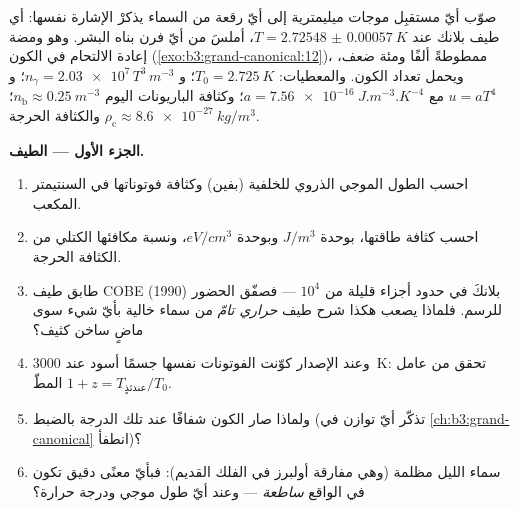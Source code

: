 \begin{problem}\label{pb:b3:photons-phonons:1}
صوّب أيّ مستقبِل موجات ميليمترية إلى أيّ رقعة من السماء يذكرْ
الإشارة نفسها: أي طيف بلانك عند $T =
\qty{2.72548(57)}{K}$، أملسَ من أيّ فرن بناه البشر.
وهو ومضة إعادة الالتحام في الكون
(\cref{exo:b3:grand-canonical:12})، ممطوطةً ألفًا ومئة ضعف،
ويحمل تعداد الكون. والمعطيات: $T_0 =
\qty{2.725}{K}$؛ و $n_\gamma = \num{2.03e7}\,T^3\,\unit{m^{-3}}$؛ و
$u = aT^4$ مع $a = \qty{7.56e-16}{J.m^{-3}.K^{-4}}$؛ وكثافة الباريونات
اليوم $n_{\text{b}} \approx \qty{0.25}{m^{-3}}$؛ والكثافة الحرجة
$\rho_{\text{c}} \approx \qty{8.6e-27}{kg/m^3}$.

\medskip\noindent\textbf{الجزء الأول --- الطيف.}
\begin{enumerate}
  \item احسب الطول الموجي الذروي للخلفية (بفين) وكثافة
        فوتوناتها في السنتيمتر المكعب.
  \item احسب كثافة طاقتها، بوحدة $\unit{J/m^3}$ وبوحدة
        $\unit{eV/cm^3}$، ونسبة مكافئها الكتلي من
        الكثافة الحرجة.
  \item طابق طيف COBE (1990) بلانكَ في حدود أجزاء قليلة من
        $10^4$ --- فصفّق الحضور للرسم. فلماذا يصعب هكذا شرح
        طيف \emph{حراري تامّ} من سماء خالية بأيّ شيء
        سوى ماضٍ ساخن كثيف؟
  \item وعند الإصدار كوّنت الفوتونات نفسها جسمًا أسود عند \qty{3000}{K}:
        تحقق من عامل المطّ $1 + z =
        T_{\text{عندئذٍ}}/T_0$.
  \item ولماذا صار الكون شفافًا عند تلك الدرجة بالضبط
        (تذكّر أيّ توازن في
        \cref{ch:b3:grand-canonical} انطفأ)؟
  \item سماء الليل مظلمة (وهي مفارقة أولبرز في الفلك
        القديم): فبأيّ معنًى دقيق تكون في الواقع
        \emph{ساطعة} --- وعند أيّ طول موجي ودرجة حرارة؟
\end{enumerate}


\end{problem}
